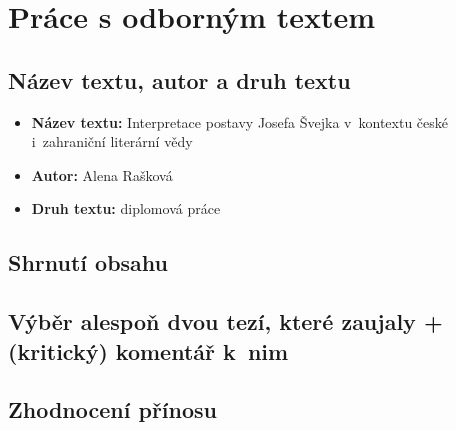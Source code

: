 \section{Práce s odborným textem\cite{interpretace_postavy_josefa_svejka}}

\subsection{Název textu, autor a druh textu}
\begin{itemize}
	\item \textbf{Název textu:} Interpretace postavy Josefa Švejka v~kontextu české i~zahraniční literární vědy
	\item \textbf{Autor:} Alena Rašková
	\item \textbf{Druh textu:} diplomová práce
\end{itemize}

\subsection{Shrnutí obsahu}

\subsection{Výběr alespoň dvou tezí, které zaujaly + (kritický) komentář k nim}

\subsection{Zhodnocení přínosu}

\newpage
